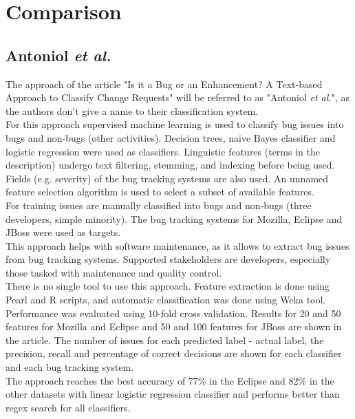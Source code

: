 \section{Comparison}
\subsection{Antoniol \textit{et al.}}
The approach of the article "Is it a Bug or an Enhancement? A Text-based Approach to
Classify Change Requests" \cite{Antoniol2008} will be referred to as "Antoniol \textit{et al.}", as the authors don't give a name to their classification system.\\
For this approach supervised machine learning is used to classify bug issues into bugs and non-bugs (other activities). Decision trees, naive Bayes classifier and logistic regression were used as classifiers. Linguistic features (terms in the description) undergo text filtering, stemming, and indexing before being used. Fields (e.g. severity) of the bug tracking systems are also used. An unnamed feature selection algorithm is used to select a subset of available features.\\
For training issues are manually classified into bugs and non-bugs (three developers, simple minority). The bug tracking systems for Mozilla, Eclipse and JBoss were used as targets.\\
This approach helps with software maintenance, as it allows to extract bug issues from bug tracking systems. Supported stakeholders are developers, especially those tasked with maintenance and quality control.\\
There is no single tool to use this approach. Feature extraction is done using Pearl and R scripts, and automatic classification was done using Weka tool.\\
Performance was evaluated using 10-fold cross validation. Results for 20 and 50 features for Mozilla and Eclipse and 50 and 100 features for JBoss are shown in the article. The number of issues for each predicted label - actual label, the precision, recall and percentage of correct decisions are shown for each classifier and each bug tracking system.\\
The approach reaches the best accuracy of 77\% in the Eclipse and 82\% in the other datasets with linear logistic regression classifier and performs better than regex search for all classifiers.

